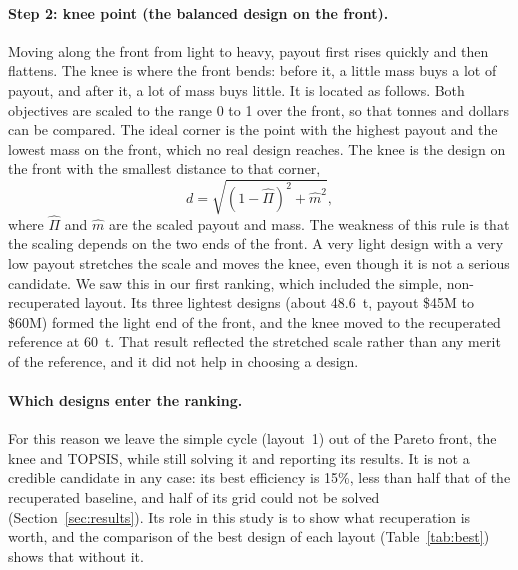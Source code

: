 \paragraph{Step 2: knee point (the balanced design on the front).} Moving along the front from light to heavy, payout first rises quickly and then flattens. The knee is where the front bends: before it, a little mass buys a lot of payout, and after it, a lot of mass buys little. It is located as follows. Both objectives are scaled to the range 0 to 1 over the front, so that tonnes and dollars can be compared. The ideal corner is the point with the highest payout and the lowest mass on the front, which no real design reaches. The knee is the design on the front with the smallest distance to that corner,
\begin{equation}
d = \sqrt{(1 - \hat\Pi)^2 + \hat m^2},
\end{equation}
where $\hat\Pi$ and $\hat m$ are the scaled payout and mass. The weakness of this rule is that the scaling depends on the two ends of the front. A very light design with a very low payout stretches the scale and moves the knee, even though it is not a serious candidate. We saw this in our first ranking, which included the simple, non-recuperated layout. Its three lightest designs (about \SI{48.6}{t}, payout \$45M to \$60M) formed the light end of the front, and the knee moved to the recuperated reference at \SI{60}{t}. That result reflected the stretched scale rather than any merit of the reference, and it did not help in choosing a design.

\paragraph{Which designs enter the ranking.} For this reason we leave the simple cycle (layout~1) out of the Pareto front, the knee and TOPSIS, while still solving it and reporting its results. It is not a credible candidate in any case: its best efficiency is 15\%, less than half that of the recuperated baseline, and half of its grid could not be solved (Section~\ref{sec:results}). Its role in this study is to show what recuperation is worth, and the comparison of the best design of each layout (Table~\ref{tab:best}) shows that without it.

